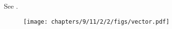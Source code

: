 See .
\begin{figure}[H]
 \begin{center}
	 \texttt{[image: chapters/9/11/2/2/figs/vector.pdf]}
 \end{center}
 \caption{}
 \label{fig:Fig1}
\end{figure}
